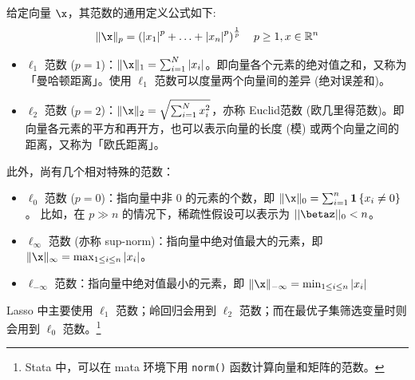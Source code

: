 给定向量 $\x$，其范数的通用定义公式如下:
$$
\|\x\|_{p}=\left(\left|x_{1}\right|^{p}+\ldots+\left|x_{n}\right|^{p}\right)^{\frac{1}{p}} \quad p \geq 1, x \in \mathbb{R}^{n}
$$

\begin{itemize}
\item 
$\ell_{1}$ 范数 ($p=1$)：$\|\x\|_{1}=\sum_{i=1}^{N}\left|x_{i}\right|$。即向量各个元素的绝对值之和，又称为「曼哈顿距离」。使用 $\ell_{1}$ 范数可以度量两个向量间的差异 (绝对误差和)。
\item 
$\ell_{2}$ 范数 ($p=2$)：$\|\x\|_{2}=\sqrt{\sum_{i=1}^{N} x_{i}^{2}}$，亦称 Euclid范数 (欧几里得范数)。即向量各元素的平方和再开方，也可以表示向量的长度 (模) 或两个向量之间的距离，又称为「欧氏距离」。
\end{itemize}

此外，尚有几个相对特殊的范数：

\begin{itemize}
\item
$\ell_{0}$ 范数 ($p=0$)：指向量中非 0 的元素的个数，即 $\|\x\|_{0}=\sum_{i=1}^{n} \mathbf{1}\left\{x_{i} \neq 0\right\}$。%
比如，在 $p\!\gg\!n$ 的情况下，稀疏性假设可以表示为 $||\betaz||_0<n$。
\item  
$\ell_{\infty}$ 范数 (亦称 sup-norm)：指向量中绝对值最大的元素，即 $\|\x\|_{\infty}=\max _{1 \leq i \leq n}\left|x_{i}\right|$。
\item  
$\ell_{-\infty}$ 范数：指向量中绝对值最小的元素，即 $\|\x\|_{-\infty}=\min _{1 \leq i \leq n}\left|x_{i}\right|$
\end{itemize}

Lasso 中主要使用 $\ell_{1}$ 范数；岭回归会用到 $\ell_{2}$ 范数；而在最优子集筛选变量时则会用到 $\ell_{0}$ 范数。\footnote{%
  Stata 中，可以在 mata 环境下用 \texttt{norm()} 函数计算向量和矩阵的范数。 }



\iffalse
